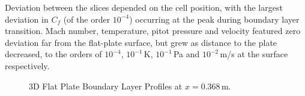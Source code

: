 Deviation between the slices depended on the cell position, with the largest deviation in $C_f$ (of the order $10^{-4}$) occurring at the peak during boundary layer transition. Mach number, temperature, pitot pressure and velocity featured zero deviation far from the flat-plate surface, but grew as distance to the plate decreased, to the orders of $10^{-4}$, $10^{-1}$\,K, $10^{-1}$\,Pa and $10^{-2}$\,m/s at the surface respectively.
%
\begin{figure} %
	\centering
	\qquad
	
	\qquad
	\caption{3D Flat Plate Boundary Layer Profiles at $x=0.368$\,m.}%
	\label{f:tc1:profiles}%
\end{figure}
